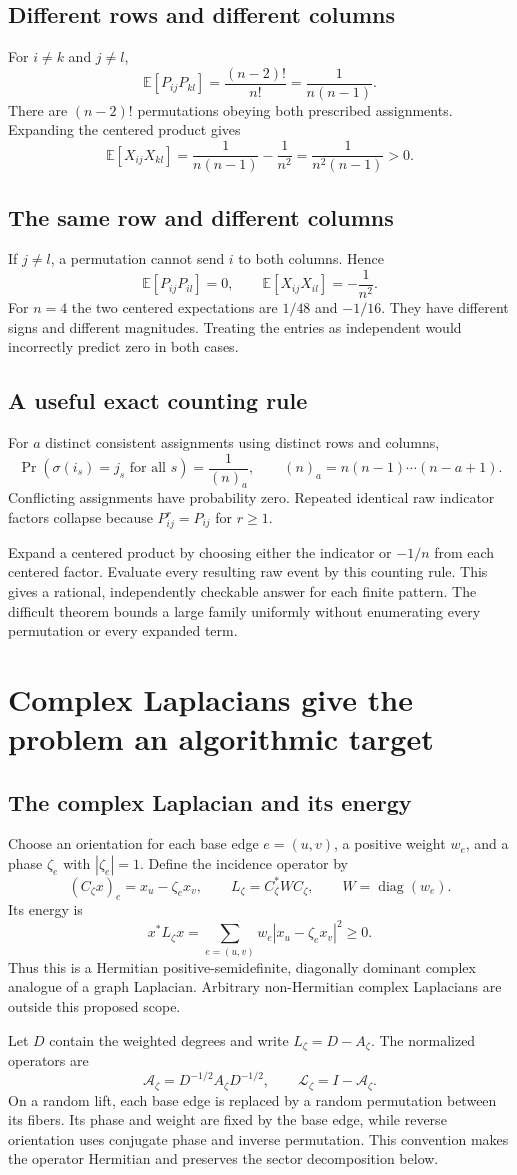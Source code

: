 \documentclass[11pt,letterpaper]{article}
\newcommand{\Page}[1]{\clearpage\section*{#1}}
\newcommand{\Sub}[1]{\subsection*{#1}}
\newcommand{\E}{\mathbb E}
\begin{document}
\Sub{Different rows and different columns}
For $i\ne k$ and $j\ne l$,
\[
 \E[P_{ij}P_{kl}]=\frac{(n-2)!}{n!}
                 =\frac{1}{n(n-1)}.
\]
There are $(n-2)!$ permutations obeying both prescribed assignments. Expanding the centered product gives
\[
 \E[X_{ij}X_{kl}]=\frac{1}{n(n-1)}-\frac{1}{n^2}
                 =\frac{1}{n^2(n-1)}>0.
\]

\Sub{The same row and different columns}
If $j\ne l$, a permutation cannot send $i$ to both columns. Hence
\[
 \E[P_{ij}P_{il}]=0,\qquad
 \E[X_{ij}X_{il}]=-\frac{1}{n^2}.
\]
For $n=4$ the two centered expectations are $1/48$ and $-1/16$. They have different signs and different magnitudes. Treating the entries as independent would incorrectly predict zero in both cases.

\Sub{A useful exact counting rule}
For $a$ distinct consistent assignments using distinct rows and columns,
\[
 \Pr(\sigma(i_s)=j_s\text{ for all }s)
 =\frac{1}{(n)_a},\qquad (n)_a=n(n-1)\cdots(n-a+1).
\]
Conflicting assignments have probability zero. Repeated identical raw indicator factors collapse because $P_{ij}^r=P_{ij}$ for $r\geq1$.

Expand a centered product by choosing either the indicator or $-1/n$ from each centered factor. Evaluate every resulting raw event by this counting rule. This gives a rational, independently checkable answer for each finite pattern. The difficult theorem bounds a large family uniformly without enumerating every permutation or every expanded term.


\Page{Complex Laplacians give the problem an algorithmic target}

\Sub{The complex Laplacian and its energy}
Choose an orientation for each base edge $e=(u,v)$, a positive weight $w_e$, and a phase $\zeta_e$ with $|\zeta_e|=1$. Define the incidence operator by
\[
 (C_\zeta x)_e=x_u-\zeta_e x_v,
 \qquad L_\zeta=C_\zeta^*WC_\zeta,
 \qquad W=\operatorname{diag}(w_e).
\]
Its energy is
\[
 x^*L_\zeta x=\sum_{e=(u,v)}w_e|x_u-\zeta_e x_v|^2\geq0.
\]
Thus this is a Hermitian positive-semidefinite, diagonally dominant complex analogue of a graph Laplacian. Arbitrary non-Hermitian complex Laplacians are outside this proposed scope.

Let $D$ contain the weighted degrees and write $L_\zeta=D-A_\zeta$. The normalized operators are
\[
 \mathcal A_\zeta=D^{-1/2}A_\zeta D^{-1/2},
 \qquad \mathcal L_\zeta=I-\mathcal A_\zeta.
\]
On a random lift, each base edge is replaced by a random permutation between its fibers. Its phase and weight are fixed by the base edge, while reverse orientation uses conjugate phase and inverse permutation. This convention makes the operator Hermitian and preserves the sector decomposition below.
\end{document}
